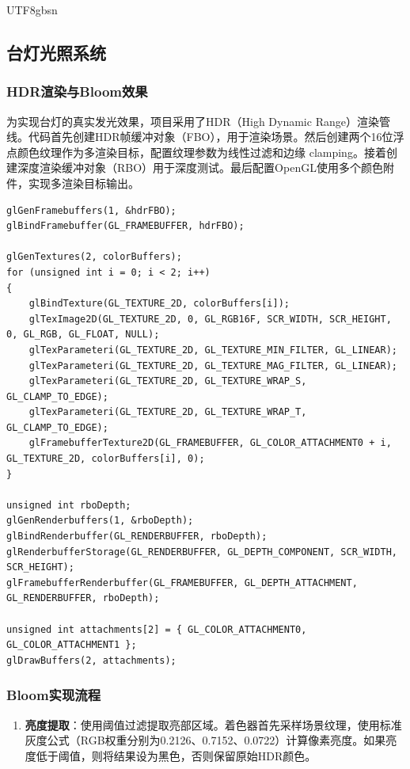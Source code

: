 \documentclass{article}
\begin{document}
\begin{CJK}{UTF8}{gbsn}
\subsection{台灯光照系统}

\subsubsection{HDR渲染与Bloom效果}
为实现台灯的真实发光效果，项目采用了HDR（High Dynamic Range）渲染管线。代码首先创建HDR帧缓冲对象（FBO），用于渲染场景。然后创建两个16位浮点颜色纹理作为多渲染目标，配置纹理参数为线性过滤和边缘 clamping。接着创建深度渲染缓冲对象（RBO）用于深度测试。最后配置OpenGL使用多个颜色附件，实现多渲染目标输出。

\begin{lstlisting}[caption=HDR FBO创建]
glGenFramebuffers(1, &hdrFBO);
glBindFramebuffer(GL_FRAMEBUFFER, hdrFBO);

glGenTextures(2, colorBuffers);
for (unsigned int i = 0; i < 2; i++)
{
    glBindTexture(GL_TEXTURE_2D, colorBuffers[i]);
    glTexImage2D(GL_TEXTURE_2D, 0, GL_RGB16F, SCR_WIDTH, SCR_HEIGHT, 0, GL_RGB, GL_FLOAT, NULL);
    glTexParameteri(GL_TEXTURE_2D, GL_TEXTURE_MIN_FILTER, GL_LINEAR);
    glTexParameteri(GL_TEXTURE_2D, GL_TEXTURE_MAG_FILTER, GL_LINEAR);
    glTexParameteri(GL_TEXTURE_2D, GL_TEXTURE_WRAP_S, GL_CLAMP_TO_EDGE);
    glTexParameteri(GL_TEXTURE_2D, GL_TEXTURE_WRAP_T, GL_CLAMP_TO_EDGE);
    glFramebufferTexture2D(GL_FRAMEBUFFER, GL_COLOR_ATTACHMENT0 + i, GL_TEXTURE_2D, colorBuffers[i], 0);
}

unsigned int rboDepth;
glGenRenderbuffers(1, &rboDepth);
glBindRenderbuffer(GL_RENDERBUFFER, rboDepth);
glRenderbufferStorage(GL_RENDERBUFFER, GL_DEPTH_COMPONENT, SCR_WIDTH, SCR_HEIGHT);
glFramebufferRenderbuffer(GL_FRAMEBUFFER, GL_DEPTH_ATTACHMENT, GL_RENDERBUFFER, rboDepth);

unsigned int attachments[2] = { GL_COLOR_ATTACHMENT0, GL_COLOR_ATTACHMENT1 };
glDrawBuffers(2, attachments);
\end{lstlisting}

\subsubsection{Bloom实现流程}
\begin{enumerate}
    \item \textbf{亮度提取}：使用阈值过滤提取亮部区域。着色器首先采样场景纹理，使用标准灰度公式（RGB权重分别为0.2126、0.7152、0.0722）计算像素亮度。如果亮度低于阈值，则将结果设为黑色，否则保留原始HDR颜色。


\end{enumerate}
\end{CJK}
\end{document}
